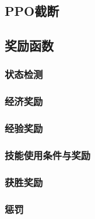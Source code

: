 \subsection{PPO截断}

\subsection{奖励函数}

\subsubsection{状态检测}
\subsubsection{经济奖励}
\subsubsection{经验奖励}
\subsubsection{技能使用条件与奖励}
\subsubsection{获胜奖励}
\subsubsection{惩罚}